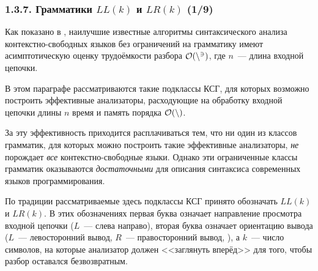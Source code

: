 \begin{frame}
\frametitle{1.3.7. Грамматики $LL(k)$ и $LR(k)$ (1/9)}

Как показано в , 
наилучшие известные алгоритмы синтаксического анализа \\
контекстно-свободных языков без ограничений на грамматику  
имеют асимптотическую оценку трудоёмкости 
разбора $ \cal{O}(n^3)$, где $n$~--- длина входной цепочки.  

\smallskip
В этом параграфе рассматриваются такие подклассы КСГ, 
для которых возможно построить эффективные анализаторы, 
расходующие на обработку входной цепочки длины \(n\) время и память 
порядка $\cal{O}(n)$. 

\smallskip
За эту эффективность приходится расплачиваться тем, что ни один из классов грамматик,
для которых можно построить такие эффективные анализаторы,
{\em не} порождает {\em все} контекстно-свободные языки. 
Однако эти ограниченные классы грамматик оказываются 
{\em достаточными} для описания синтаксиса современных языков программирования.

\smallskip
\begin{digress}
По традиции рассматриваемые здесь подклассы КСГ
принято обозначать $LL(k)$ и $LR(k)$. 
В этих обозначениях первая буква означает направление просмотра
входной цепочки ($L$~--- слева направо), 
вторая буква означает ориентацию вывода
($L$~--- левосторонний вывод, $R$~--- правосторонний вывод, 
),
а $k$~--- число символов, на которые анализатор должен <<заглянуть вперёд>>
для того, чтобы разбор оставался безвозвратным. 
\end{digress}

\end{frame}

